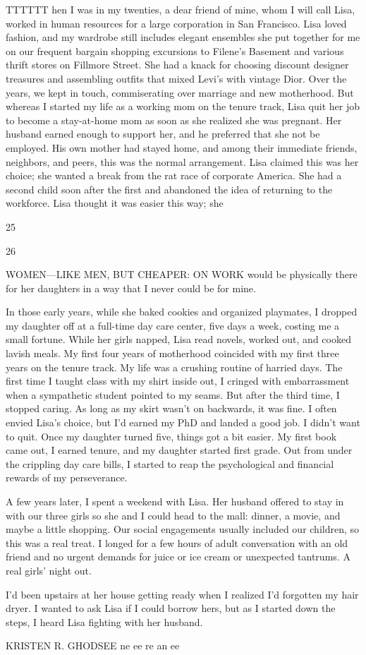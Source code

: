 TTTTTT hen I was in my twenties, a dear friend of mine, whom I will call Lisa, worked in human resources for a large corporation in San Francisco. Lisa loved fashion, and my wardrobe still includes elegant ensembles she put together for me on our frequent bargain shopping excursions to Filene’s Basement and various thrift stores on Fillmore Street. She had a knack for choosing discount designer treasures and assembling outfits that mixed Levi’s with vintage Dior. Over the years, we kept in touch, commiserating over marriage and new motherhood. But whereas I started my life as a working mom on the tenure track, Lisa quit her job to become a stay-at-home mom as soon as she realized she was pregnant. Her husband earned enough to support her, and he preferred that she not be employed. His own mother had stayed home, and among their immediate friends, neighbors, and peers, this was the normal arrangement. Lisa claimed this was her choice; she wanted a break from the rat race of corporate America. She had a second child soon after the first and abandoned the idea of returning to the workforce. Lisa thought it was easier this way; she
 \par 

 \par 
25
 \par 
26
 \par 
WOMEN—LIKE MEN, BUT CHEAPER: ON WORK would be physically there for her daughters in a way that I never could be for mine.
 \par 
In those early years, while she baked cookies and organized playmates, I dropped my daughter off at a full-time day care center, five days a week, costing me a small fortune. While her girls napped, Lisa read novels, worked out, and cooked lavish meals. My first four years of motherhood coincided with my first three years on the tenure track. My life was a crushing routine of harried days. The first time I taught class with my shirt inside out, I cringed with embarrassment when a sympathetic student pointed to my seams. But after the third time, I stopped caring. As long as my skirt wasn’t on backwards, it was fine. I often envied Lisa’s choice, but I'd earned my PhD and landed a good job. I didn’t want to quit. Once my daughter turned five, things got a bit easier. My first book came out, I earned tenure, and my daughter started first grade. Out from under the crippling day care bills, I started to reap the psychological and financial rewards of my perseverance.
 \par 
A few years later, I spent a weekend with Lisa. Her husband offered to stay in with our three girls so she and I could head to the mall: dinner, a movie, and maybe a little shopping. Our social engagements usually included our children, so this was a real treat. I longed for a few hours of adult conversation with an old friend and no urgent demands for juice or ice cream or unexpected tantrums. A real girls’ night out.
 \par 
I'd been upstairs at her house getting ready when I realized I'd forgotten my hair dryer. I wanted to ask Lisa if I could borrow hers, but as I started down the steps, I heard Lisa fighting with her husband.
 \par 
KRISTEN R. GHODSEE ne ee re an ee
 \par 
